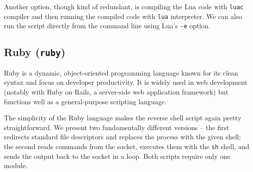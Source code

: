 

Another option, though kind of redundant, is compiling the Lua code with \texttt{luac} compiler and then running the compiled code with \texttt{lua} interpreter. We can also run the script directly from the command line using Lua's \texttt{-e} option.



\subsection{Ruby (\texttt{ruby})}


Ruby is a dynamic, object-oriented programming language known for its clean syntax and focus on developer productivity. It is widely used in web development (notably with Ruby on Rails, a server-side web application framework) but functions well as a general-purpose scripting language.

The simplicity of the Ruby language makes the reverse shell script again pretty straightforward. We present two fundamentally different versions -- the first redirects standard file descriptors and replaces the process with the given shell; the second reads commands from the socket, executes them with the \texttt{sh} shell, and sends the output back to the socket in a loop. Both scripts require only one module.




